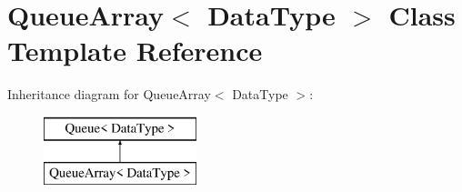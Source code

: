 \section{Queue\+Array$<$ Data\+Type $>$ Class Template Reference}
\label{class_queue_array}
Inheritance diagram for Queue\+Array$<$ Data\+Type $>$\+:\begin{figure}[H]
\begin{center}
\leavevmode
\includegraphics[height=2.000000cm]{class_queue_array}
\end{center}
\end{figure}
